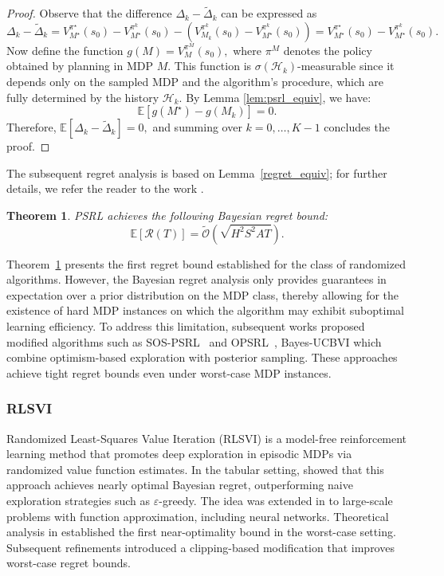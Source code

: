 \documentclass{article}
\numberwithin{equation}{section}
\newtheorem{theorem}{Theorem}
\newcommand{\E}{\mathbb E}
\begin{document}
\begin{proof}
    Observe that the difference \(\Delta_k - \widetilde{\Delta}_k\) can be expressed as
    \[
    \Delta_k - \widetilde{\Delta}_k = V^{\pi^{\star}}_{M^{\star}}(s_0) - {V^{\pi^k}_{M^\star}(s_0)} - \left( V^{\pi^k}_{M_k}(s_0) - V^{\pi^k}_{M^{\star}}(s_0) \right) = V^{\pi^{\star}}_{M^{\star}}(s_0) - V^{\pi^k}_{M^{\star}}(s_0).
    \]
    Now define the function \(g(M) = V^{\pi^M}_{M}(s_0),\) where \(\pi^M\) denotes the policy obtained by planning in MDP \(M\). This function is \(\sigma(\mathcal{H}_k)\)-measurable since it depends only on the sampled MDP and the algorithm's procedure, which are fully determined by the history \(\mathcal{H}_k\). By Lemma \ref{lem:psrl_equiv}, we have:
    \[
    \mathbb{E}[g(M^{\star}) - g(M_k)] = 0.
    \]
    Therefore, \(\mathbb{E}[\Delta_k - \widetilde{\Delta}_k] = 0,\) and summing over \(k = 0, \dots, K-1\) concludes the proof.
\end{proof}


The subsequent regret analysis is based on Lemma~\ref{regret_equiv}; for further details, we refer the reader to the work \cite{osband2013more}.

\begin{theorem}\label{PSRL}
    PSRL achieves the following Bayesian
regret bound:
    \begin{equation}
         \E[\mathcal{R}(T)] = \widetilde{\mathcal{O}}(\sqrt{H^2S^2AT}).
    \end{equation}
\end{theorem}
Theorem~\ref{PSRL} presents the first regret bound established for the class of randomized algorithms. However, the Bayesian regret analysis only provides guarantees in expectation over a prior distribution on the MDP class, thereby allowing for the existence of hard MDP instances on which the algorithm may exhibit suboptimal learning efficiency. To address this limitation, subsequent works proposed modified algorithms such as SOS-PSRL~\cite{agrawal2017opsrl_worst} and OPSRL~\cite{tiapkin2022opsrl}, Bayes-UCBVI \cite{tiapkin2022dirichlet} which combine optimism-based exploration with posterior sampling. These approaches achieve tight regret bounds even under worst-case MDP instances.

\subsubsection{RLSVI}
Randomized Least-Squares Value Iteration (RLSVI) is a model-free reinforcement learning method that promotes deep exploration in episodic MDPs via randomized value function estimates. In the tabular setting, \citet{osband2016generalization} showed that this approach achieves nearly optimal Bayesian regret, outperforming naive exploration strategies such as $\varepsilon$-greedy. The idea was extended in \cite{osband2019deep} to large-scale problems with function approximation, including neural networks.
Theoretical analysis in \cite{russo2019worst} established the first near-optimality bound in the worst-case setting. Subsequent refinements \cite{agrawal2021improved} introduced a clipping-based modification that improves worst-case regret bounds.
\end{document}
